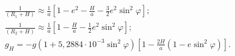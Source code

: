 \begin{equation} 
\label{eq:gravity} 
\begin{array}{l}{\frac{1}{(R_{1} +H)} \approx \frac{1}{a}\left[1-e^{2} -\frac{H}{a} -\frac{3}{2} e^{2} \sin ^{2} \varphi\right];} \\ 
{\frac{1}{(R_{2} +H)} \approx \frac{1}{a} \left[1-\frac{H}{a} -\frac{1}{2} e^{2} \sin ^{2}\varphi\right]  ;} \\ 
{g_{H} =-g\left(1+5,2884\cdot 10^{-3} \sin ^{2}\varphi \right)\left[1-\frac{2H}{a} \left(1-e\sin ^{2}\varphi \right)\right].} 
\end{array} 
\end{equation} 








